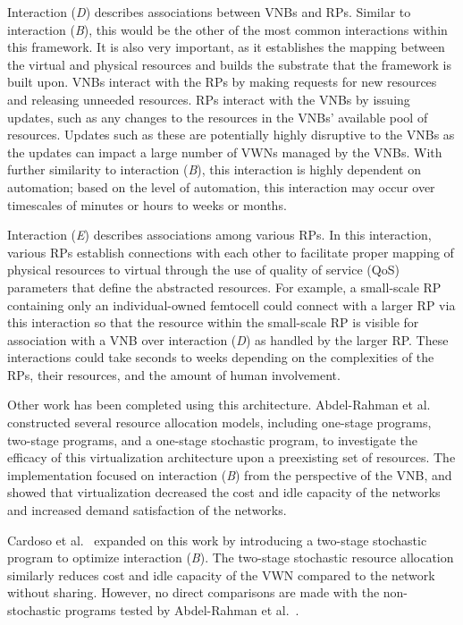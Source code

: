 \documentclass[12pt,dvipsnames]{report}
\begin{document}
Interaction (\emph{D}) describes associations between VNBs and RPs.  Similar to interaction (\emph{B}), this would be the other of the most common interactions within this framework.  It is also very important, as it establishes the mapping between the virtual and physical resources and builds the substrate that the framework is built upon.  VNBs interact with the RPs by making requests for new resources and releasing unneeded resources.  RPs interact with the VNBs by issuing updates, such as any changes to the resources in the VNBs' available pool of resources.  Updates such as these are potentially highly disruptive to the VNBs as the updates can impact a large number of VWNs managed by the VNBs.  With further similarity to interaction (\emph{B}), this interaction is highly dependent on automation; based on the level of automation, this interaction may occur over timescales of minutes or hours to weeks or months.

Interaction (\emph{E}) describes associations among various RPs.  In this interaction, various RPs establish connections with each other to facilitate proper mapping of physical resources to virtual through the use of quality of service (QoS) parameters that define the abstracted resources.  For example, a small-scale RP containing only an individual-owned femtocell could connect with a larger RP via this interaction so that the resource within the small-scale RP is visible for association with a VNB over interaction (\emph{D}) as handled by the larger RP.  These interactions could take seconds to weeks depending on the complexities of the RPs, their resources, and the amount of human involvement.

Other work has been completed using this architecture.  Abdel-Rahman et al.~\cite{MJ_CCNC_16} constructed several resource allocation models, including one-stage programs, two-stage programs, and a one-stage stochastic program, to investigate the efficacy of this virtualization architecture upon a preexisting set of resources.  The implementation focused on interaction (\emph{B}) from the perspective of the VNB, and showed that virtualization decreased the cost and idle capacity of the networks and increased demand satisfaction of the networks.

Cardoso et al.~\cite{MJ_MECOMM_17} expanded on this work by introducing a two-stage stochastic program to optimize interaction (\emph{B}).  The two-stage stochastic resource allocation similarly reduces cost and idle capacity of the VWN compared to the network without sharing.  However, no direct comparisons are made with the non-stochastic programs tested by Abdel-Rahman et al.~\cite{MJ_CCNC_16}.
\end{document}
